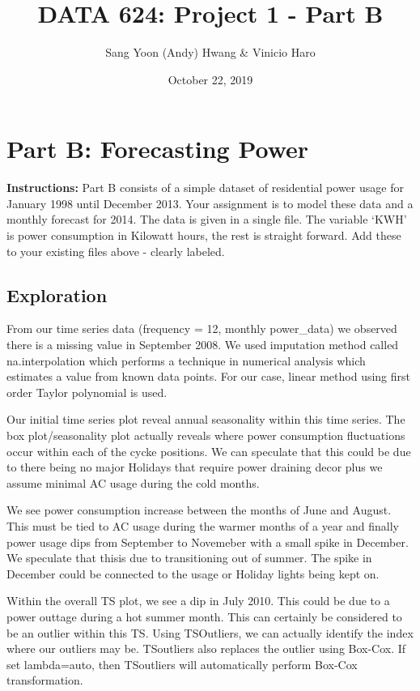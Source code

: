 \documentclass[openany]{book}
\title{DATA 624: Project 1 - Part B}
\author{Sang Yoon (Andy) Hwang \& Vinicio Haro}
\date{October 22, 2019}
\renewenvironment{quote}{\begin{myquote}}{\end{myquote}}
\begin{document}
\maketitle

{
\setcounter{tocdepth}{1}
\tableofcontents
}
\chapter*{Part B: Forecasting Power}\label{part-b}

\begin{quote}
\textbf{Instructions:} Part B consists of a simple dataset of
residential power usage for January 1998 until December 2013. Your
assignment is to model these data and a monthly forecast for 2014. The
data is given in a single file. The variable `KWH' is power consumption
in Kilowatt hours, the rest is straight forward. Add these to your
existing files above - clearly labeled.
\end{quote}

\section*{Exploration}\label{b-exploration}

From our time series data (frequency = 12, monthly power\_data) we
observed there is a missing value in September 2008. We used imputation
method called na.interpolation which performs a technique in numerical
analysis which estimates a value from known data points. For our case,
linear method using first order Taylor polynomial is used.

Our initial time series plot reveal annual seasonality within this time
series. The box plot/seasonality plot actually reveals where power
consumption fluctuations occur within each of the cycke positions. We
can speculate that this could be due to there being no major Holidays
that require power draining decor plus we assume minimal AC usage during
the cold months.

We see power consumption increase between the months of June and August.
This must be tied to AC usage during the warmer months of a year and
finally power usage dips from September to Novemeber with a small spike
in December. We speculate that thisis due to transitioning out of
summer. The spike in December could be connected to the usage or Holiday
lights being kept on.

Within the overall TS plot, we see a dip in July 2010. This could be due
to a power outtage during a hot summer month. This can certainly be
considered to be an outlier within this TS. Using TSOutliers, we can
actually identify the index where our outliers may be. TSoutliers also
replaces the outlier using Box-Cox. If set lambda=auto, then TSoutliers
will automatically perform Box-Cox transformation.
\end{document}
